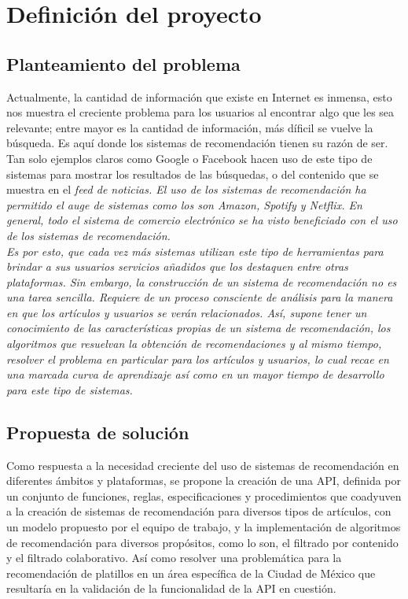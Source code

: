\chapter {Definición del proyecto}
  \section{Planteamiento del problema}
    Actualmente, la cantidad de información que existe en Internet es inmensa, esto nos muestra el creciente problema para los usuarios al encontrar algo que les sea relevante; entre mayor es la cantidad de información, más díficil se vuelve la búsqueda. Es aquí donde los sistemas de recomendación tienen su razón de ser. Tan solo ejemplos claros como Google o Facebook hacen uso de este tipo de sistemas para mostrar los resultados de las búsquedas, o del contenido que se muestra en el \it{feed} de noticias. El uso de los sistemas de recomendación ha permitido el auge de sistemas como los son Amazon, Spotify y Netflix. En general, todo el sistema de comercio electrónico se ha visto beneficiado con el uso de los sistemas de recomendación.\\

    Es por esto, que cada vez más sistemas utilizan este tipo de herramientas para brindar a sus usuarios servicios añadidos que los destaquen entre otras plataformas. Sin embargo, la construcción de un sistema de recomendación no es una tarea sencilla. Requiere de un proceso consciente de análisis para la manera en que los artículos y usuarios se verán relacionados. Así, supone tener un conocimiento de las características propias de un sistema de recomendación, los algoritmos que resuelvan la obtención de recomendaciones y al mismo tiempo, resolver el problema en particular para los artículos y usuarios, lo cual recae en una marcada curva de aprendizaje así como en un mayor tiempo de desarrollo para este tipo de sistemas.\\

  \section{Propuesta de solución}
    Como respuesta a la necesidad creciente del uso de sistemas de recomendación en diferentes ámbitos y plataformas, se propone la creación de una API, definida por un conjunto de funciones, reglas, especificaciones y procedimientos que coadyuven a la creación de sistemas de recomendación para diversos tipos de artículos, con un modelo propuesto por el equipo de trabajo, y la implementación de algoritmos de recomendación para diversos propósitos, como lo son, el filtrado por contenido y el filtrado colaborativo. Así como resolver una problemática para la recomendación de platillos en un área específica de la Ciudad de México que resultaría en la validación de la funcionalidad de la API en cuestión. 

